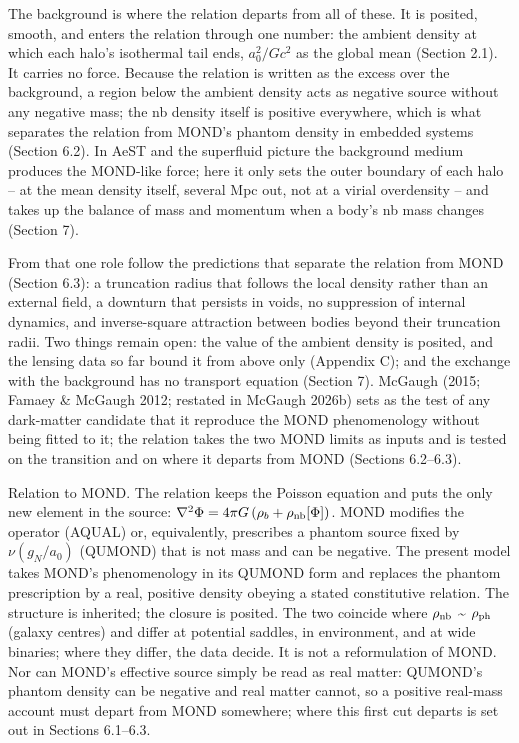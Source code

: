 \documentclass[
  10pt,
]{article}
\begin{document}
The background is where the relation departs from all of these. It is posited, smooth, and enters the relation through one number: the ambient density at which each halo's isothermal tail ends, $a_0^2/Gc^2$ as the global mean (Section 2.1). It carries no force. Because the relation is written as the excess over the background, a region below the ambient density acts as negative source without any negative mass; the nb density itself is positive everywhere, which is what separates the relation from MOND's phantom density in embedded systems (Section 6.2). In AeST and the superfluid picture the background medium produces the MOND-like force; here it only sets the outer boundary of each halo -- at the mean density itself, several Mpc out, not at a virial overdensity -- and takes up the balance of mass and momentum when a body's nb mass changes (Section 7).

From that one role follow the predictions that separate the relation from MOND (Section 6.3): a truncation radius that follows the local density rather than an external field, a downturn that persists in voids, no suppression of internal dynamics, and inverse-square attraction between bodies beyond their truncation radii. Two things remain open: the value of the ambient density is posited, and the lensing data so far bound it from above only (Appendix C); and the exchange with the background has no transport equation (Section 7). McGaugh (2015; Famaey \& McGaugh 2012; restated in McGaugh 2026b) sets as the test of any dark-matter candidate that it reproduce the MOND phenomenology without being fitted to it; the relation takes the two MOND limits as inputs and is tested on the transition and on where it departs from MOND (Sections 6.2--6.3).

Relation to MOND. The relation keeps the Poisson equation and puts the only
new element in the source: $\nabla^2\Phi = 4\pi G\,(\rho_b+\rho_{\rm nb}[\Phi])$. MOND modifies the operator (AQUAL) or, equivalently,
prescribes a phantom source fixed by $\nu(g_N/a_0)$ (QUMOND) that is not
mass and can be negative. The present model takes MOND's phenomenology in
its QUMOND form and replaces the phantom prescription by a real,
positive density obeying a stated constitutive relation. The structure
is inherited; the closure is posited. The two coincide where $\rho_{\rm nb}$
\textasciitilde{} $\rho_{\rm ph}$ (galaxy centres) and differ at potential
saddles, in environment, and at wide binaries; where they differ, the
data decide. It is not a reformulation of MOND. Nor can MOND's effective source simply be read as real matter: QUMOND's phantom density can be negative and real matter cannot, so a positive real-mass account must depart from MOND somewhere; where this first cut departs is set out in Sections 6.1--6.3.
\end{document}
